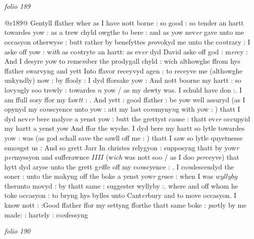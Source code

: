 \documentclass[12pt, a4paper]{book}
\begin{document}
\dotfill
					  \section*{}

\textit{folio 189}
      				
      				
      				
      				@r189@ Gentyll ffather wher as I have nott borne : so good : so tender an hartt towardes yow : as a trew chyld owgthe to bere : and as yow nev\textit{er }gave unto me occasyon otherwyse : butt rather by benefyttes \textit{pro}vokyd me unto the co\textit{n}trary : I aske off yow : w\textit{ith} as co\textit{n}tryte an hartt: as ev\textit{er} dyd David aske off god : m\textit{er}cy : And I desyre yow to reme\textit{m}ber the prodygall chyld : wich althowghe ffrom hys ffather swarvyng and yett Into ffavor receyvyd agen : to receyve me (althowghe unkyndly) now : by ffooly : I dyd fforsake yow : And nott boorne my hartt : so lovy\textit{n}gly soo trewly : towardes $n$ yow / as my dewty was. I schuld have don :. I am ffull sory ffor my faw\textit{tt} : . And yett : good ffather : be yow well assuryd (as I opynyd my co\textit{n}scyence unto yow : att my last co\textit{m}myny\textit{n}g with  yow : ) thatt I dyd nev\textit{er} bere malyce a yenst yow : butt the grettyst cause : thatt ev\textit{er} occupyid my hartt a yenst yow And ffor the wyche. I dyd bere my hartt so lytle towardes yow : was (as god schall save the sawll off me : ) thatt I saw so lytle quyetnesse emo\textit{n}gst us : And so grett Jarr In christes relygyon : supposyng thatt by yow\textit{r }p\textit{er}myssyon and sufferawnce $IIII$ (w\textit{ich} was nott soo / as I doo \textit{per}ceyve) that hytt dyd aryse unto the grett g\textit{ri}ffe off my co\textit{n}scyence : . I co\textit{n}descendyd the soner : unto the makyng off the boke a yenst yow\textit{r} g\textit{ra}ce : when I was $wyllyby$ therunto movyd : by thatt same : suggester wyllyby :. where and off whom he toke occasyon : to bryng hys bylles unto Cant\textit{er}bury and to move occasyon. I know nott : :Good ffather ffor my settyng fforthe thatt same boke : \textit{par}tly by me made: : hartely : co\textit{n}fessyng
      				
\dotfill
					

\textit{folio 190}
      				
\end{document}
